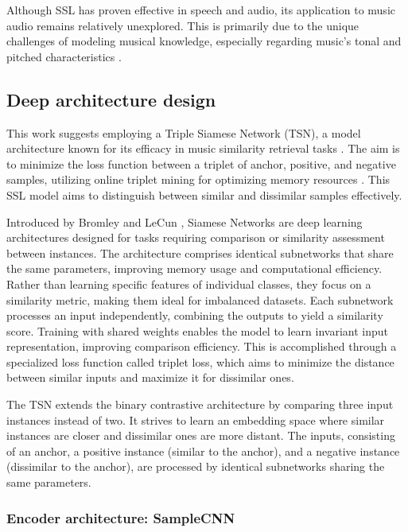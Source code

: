 Although SSL has proven effective in speech and audio, its application to music audio remains relatively unexplored. This is primarily due to the unique challenges of modeling musical knowledge, especially regarding music's tonal and pitched characteristics \cite{Li2023MERT:Training}.

\subsection{Deep architecture design}

This work suggests employing a Triple Siamese Network (TSN), a model architecture known for its efficacy in music similarity retrieval tasks \cite{contentmusicsimtriplet2020}. The aim is to minimize the loss function between a triplet of anchor, positive, and negative samples, utilizing online triplet mining for optimizing memory resources \cite{Sikaroudi2020OfflinePatches}. This SSL model aims to distinguish between similar and dissimilar samples effectively.

Introduced by Bromley and LeCun \cite{Bromley1993SignatureNetwork}, Siamese Networks are deep learning architectures designed for tasks requiring comparison or similarity assessment between instances. The architecture comprises identical subnetworks that share the same parameters, improving memory usage and computational efficiency. Rather than learning specific features of individual classes, they focus on a similarity metric, making them ideal for imbalanced datasets. Each subnetwork processes an input independently, combining the outputs to yield a similarity score. Training with shared weights enables the model to learn invariant input representation, improving comparison efficiency. This is accomplished through a specialized loss function called triplet loss, which aims to minimize the distance between similar inputs and maximize it for dissimilar ones.

The TSN extends the binary contrastive architecture by comparing three input instances instead of two. It strives to learn an embedding space where similar instances are closer and dissimilar ones are more distant. The inputs, consisting of an anchor, a positive instance (similar to the anchor), and a negative instance (dissimilar to the anchor), are processed by identical subnetworks sharing the same parameters.

\subsubsection{Encoder architecture: SampleCNN}

